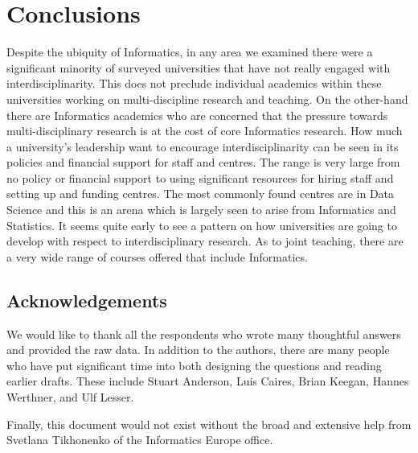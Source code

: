 \section{Conclusions}

Despite the ubiquity of Informatics, in any area we examined there were a significant minority of surveyed universities that have not really engaged with interdisciplinarity.  This does not preclude individual academics within these universities working on multi-discipline research and teaching. On the other-hand there are Informatics academics who are concerned that the pressure towards multi-disciplinary research is at the cost of core Informatics research. How much a university's leadership want to encourage interdisciplinarity can be seen in its policies and financial support for staff and centres.  The range is very large from no policy or financial support to using significant resources for hiring staff and setting up and funding centres. The most commonly found centres are in Data Science and this is an arena which is largely seen to arise from Informatics and Statistics. It seems quite early to see a pattern on how universities are going to develop with respect to interdisciplinary research. As to joint teaching, there are a very wide range of courses offered that include Informatics. 

\subsection*{Acknowledgements} We would like to thank all the respondents who wrote many thoughtful answers and provided the raw data. In addition to the authors, there are many people who have put significant time into both designing the questions and reading earlier drafts. These include Stuart Anderson, Luis Caires, Brian Keegan, Hannes Werthner, and Ulf Lesser.

Finally, this document would not exist without the broad and extensive help from Svetlana Tikhonenko of the Informatics Europe office. 
